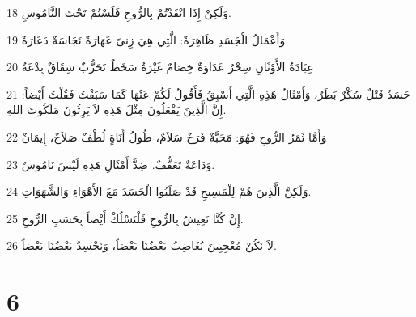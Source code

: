 \par 18 وَلَكِنْ إِذَا انْقَدْتُمْ بِالرُّوحِ فَلَسْتُمْ تَحْتَ النَّامُوسِ.
\par 19 وَأَعْمَالُ الْجَسَدِ ظَاهِرَةٌ: الَّتِي هِيَ زِنىً عَهَارَةٌ نَجَاسَةٌ دَعَارَةٌ
\par 20 عِبَادَةُ الأَوْثَانِ سِحْرٌ عَدَاوَةٌ خِصَامٌ غَيْرَةٌ سَخَطٌ تَحَزُّبٌ شِقَاقٌ بِدْعَةٌ
\par 21 حَسَدٌ قَتْلٌ سُكْرٌ بَطَرٌ، وَأَمْثَالُ هَذِهِ الَّتِي أَسْبِقُ فَأَقُولُ لَكُمْ عَنْهَا كَمَا سَبَقْتُ فَقُلْتُ أَيْضاً: إِنَّ الَّذِينَ يَفْعَلُونَ مِثْلَ هَذِهِ لاَ يَرِثُونَ مَلَكُوتَ اللهِ.
\par 22 وَأَمَّا ثَمَرُ الرُّوحِ فَهُوَ: مَحَبَّةٌ فَرَحٌ سَلاَمٌ، طُولُ أَنَاةٍ لُطْفٌ صَلاَحٌ، إِيمَانٌ
\par 23 وَدَاعَةٌ تَعَفُّفٌ. ضِدَّ أَمْثَالِ هَذِهِ لَيْسَ نَامُوسٌ.
\par 24 وَلَكِنَّ الَّذِينَ هُمْ لِلْمَسِيحِ قَدْ صَلَبُوا الْجَسَدَ مَعَ الأَهْوَاءِ وَالشَّهَوَاتِ.
\par 25 إِنْ كُنَّا نَعِيشُ بِالرُّوحِ فَلْنَسْلُكْ أَيْضاً بِحَسَبِ الرُّوحِ.
\par 26 لاَ نَكُنْ مُعْجِبِينَ نُغَاضِبُ بَعْضُنَا بَعْضاً، وَنَحْسِدُ بَعْضُنَا بَعْضاً.

\chapter{6}

